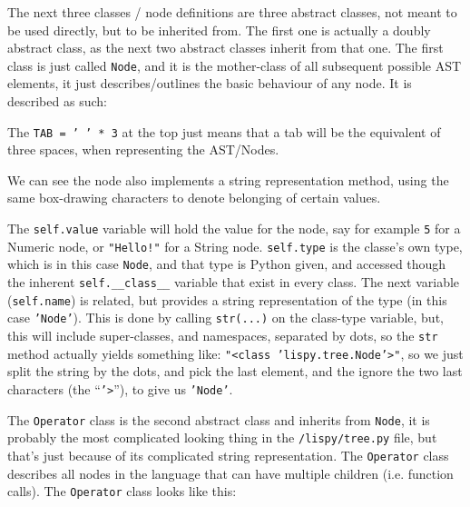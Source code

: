 \documentclass{article}
\newcommand{\code}[1]{\texttt{#1}}
\begin{document}
      \clearpage

      The next three classes / node definitions are three abstract classes,
      not meant to be used directly, but to be inherited from.
      The first one is actually a doubly abstract class, as the next two
      abstract classes inherit from that one.  The first class is just called
      \code{Node}, and it is the mother-class of all subsequent possible
      AST elements, it just describes/outlines the basic behaviour of any node.
      It is described as such:


      The \code{TAB = ' ' * 3} at the top just means that a tab will be the
      equivalent of three spaces, when representing the AST/Nodes.

      We can see the node also implements a string representation method, using
      the same box-drawing characters to denote belonging of certain values.

      The \code{self.value} variable will hold the value for the node, say for
      example \code{5} for a Numeric node, or \code{"Hello!"} for a String node.
      \code{self.type} is the classe's own type, which is in this case \code{Node}, and
      that type is Python given, and accessed though the inherent \code{self.\_\_class\_\_}
      variable that exist in every class. The next variable (\code{self.name})
      is related, but provides a string representation of the type (in this
      case \code{'Node'}). This is done by calling \code{str(...)} on the class-type
      variable, but, this will include super-classes, and namespaces, separated
      by dots, so the \code{str} method actually yields something like:
      \code{"<class 'lispy.tree.Node'>"}, so we just split the string by the dots, and
      pick the last element, and the ignore the two last characters
      (the ``\code{'>}''), to give us \code{'Node'}.

      \clearpage

      The \code{Operator} class is the second abstract class and inherits from
      \code{Node}, it is probably the most complicated looking thing in the
      \code{/lispy/tree.py} file, but that's just because of its complicated
      string representation.  The \code{Operator} class describes all nodes in
      the language that can have multiple children (i.e. function calls). The
      \code{Operator} class looks like this:

      \graph{tree_Operator}{Inherits from \code{Node}.}
\end{document}
